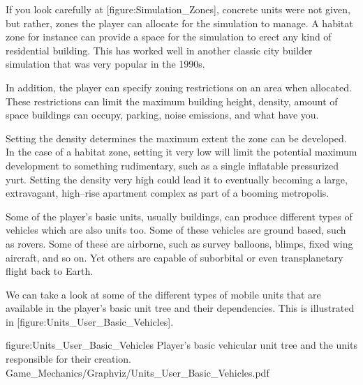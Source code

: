 \page
{}
    {}
    
    {}

If you look carefully at [figure:Simulation_Zones], concrete units were not given, but rather, zones the player can allocate for the simulation to manage. A habitat zone for instance can provide a space for the simulation to erect any kind of residential building. This has worked well in another classic city builder simulation that was very popular in the 1990s.

In addition, the player can specify zoning restrictions on an area when allocated. These restrictions can limit the maximum building height, density, amount of space buildings can occupy, parking, noise emissions, and what have you. 

Setting the density determines the maximum extent the zone can be developed. In the case of a habitat zone, setting it very low will limit the potential maximum development to something rudimentary, such as a single inflatable pressurized yurt. Setting the density very high could lead it to eventually becoming a large, extravagant, high--rise apartment complex as part of a booming metropolis.

Some of the player's basic units, usually buildings, can produce different types of vehicles which are also units too. Some of these vehicles are ground based, such as rovers. Some of these are airborne, such as survey balloons, blimps, fixed wing aircraft, and so on. Yet others are capable of suborbital or even transplanetary flight back to Earth.

We can take a look at some of the different types of mobile units that are available in the player's basic unit tree and their dependencies. This is illustrated in [figure:Units_User_Basic_Vehicles]. 

\FullPageDiagram
    {figure:Units_User_Basic_Vehicles}
    {Player's basic vehicular unit tree and the units responsible for their creation.}
    {Game_Mechanics/Graphviz/Units_User_Basic_Vehicles.pdf}


